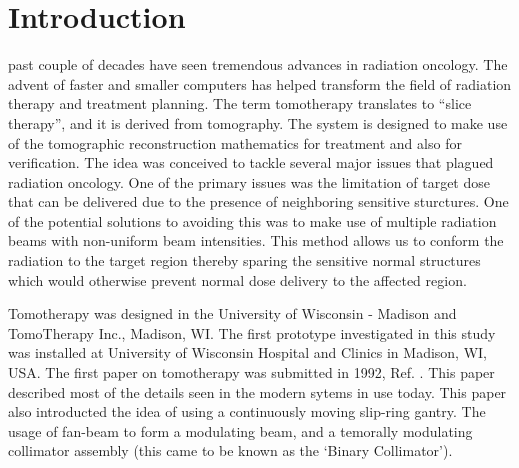 \documentclass[12pt,journal,compsoc]{IEEEtran} %
\begin{document}
  \section{Introduction}
	 past couple of decades have seen tremendous advances in 
	radiation oncology. The advent of faster and smaller computers has helped 
	transform the field of radiation therapy and treatment planning. The term 
	tomotherapy translates to ``slice therapy'', and it is derived from 
	tomography. The system is designed to make use of the tomographic 
	reconstruction mathematics for treatment and also for verification. The idea 
	was conceived to tackle several major issues that plagued radiation oncology. 
	One of the primary issues was the limitation of target dose that can be 
	delivered due to the presence of neighboring sensitive sturctures. One of the 
	potential solutions to avoiding this was to make use of multiple radiation 
	beams with non-uniform beam intensities. This method allows us to conform the 
	radiation to the target region thereby sparing the sensitive normal 
	structures which would otherwise prevent normal dose delivery to the affected 
	region.
  
  Tomotherapy was designed in the University of Wisconsin - Madison and 
  TomoTherapy Inc., Madison, WI. The first prototype investigated in this study 
  was installed at University of Wisconsin Hospital and Clinics in Madison, WI, 
  USA. The first paper on tomotherapy was submitted in 1992, Ref. 
  \cite{Mackie1993}. This paper described most of the details seen in the 
  modern sytems in use today. This paper also introducted the idea of using a 
  continuously moving slip-ring gantry. The usage of fan-beam to form a 
  modulating beam, and a temorally modulating collimator assembly (this came 
  to be known as the `Binary Collimator').
  
\end{document}
